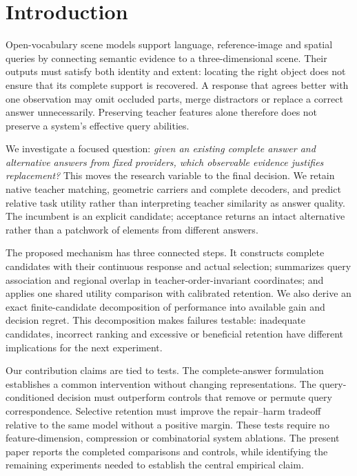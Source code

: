 \section{Introduction}
Open-vocabulary scene models support language, reference-image and spatial
queries by connecting semantic evidence to a three-dimensional scene. Their
outputs must satisfy both identity and extent: locating the right object does
not ensure that its complete support is recovered. A response that agrees
better with one observation may omit occluded parts, merge distractors or
replace a correct answer unnecessarily. Preserving teacher features alone
therefore does not preserve a system's effective query abilities.

We investigate a focused question: \emph{given an existing complete answer and
alternative answers from fixed providers, which observable evidence justifies
replacement?} This moves the research variable to the final decision. We retain
native teacher matching, geometric carriers and complete decoders, and predict
relative task utility rather than interpreting teacher similarity as answer
quality. The incumbent is an explicit candidate; acceptance returns an intact
alternative rather than a patchwork of elements from different answers.

The proposed mechanism has three connected steps. It constructs complete
candidates with their continuous response and actual selection; summarizes
query association and regional overlap in teacher-order-invariant coordinates;
and applies one shared utility comparison with calibrated retention. We also
derive an exact finite-candidate decomposition of performance into available
gain and decision regret. This decomposition makes failures testable: inadequate
candidates, incorrect ranking and excessive or beneficial retention have
different implications for the next experiment.

Our contribution claims are tied to tests. The complete-answer formulation
establishes a common intervention without changing representations. The
query-conditioned decision must outperform controls that remove or permute
query correspondence. Selective retention must improve the repair--harm tradeoff
relative to the same model without a positive margin. These tests require no
feature-dimension, compression or combinatorial system ablations. The present
paper reports the completed comparisons and controls, while identifying the
remaining experiments needed to establish the central empirical claim.
